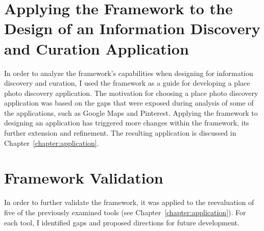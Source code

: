 {\section{Applying the Framework to the Design of an Information Discovery and Curation Application}
\label{section:applying}

In order to analyze the framework's capabilities when designing for information discovery and curation, I used the framework as a guide for developing a place photo discovery application. The motivation for choosing a place photo discovery application was based on the gaps that were exposed during analysis of some of the applications, such as Google Maps and Pinterest. Applying the framework to designing an application has triggered more changes within the framework, its further extension and refinement. The resulting application is discussed in Chapter~\ref{chapter:application}.
}%

{\section{Framework Validation}
\label{section:validating}
In order to further validate the framework, it was applied to the reevaluation of five of the previously examined tools (see Chapter~\ref{chapter:application}). For each tool, I identified gaps and proposed directions for future development. 
}%

